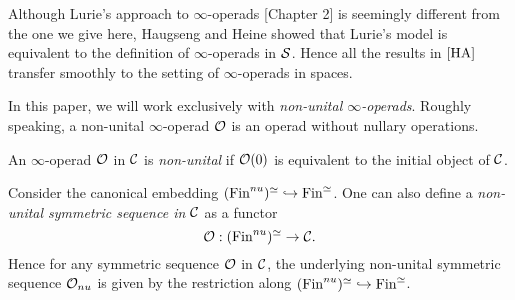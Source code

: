 \begin{remark}
Although Lurie's approach to $\infty$-operads \cite{HA}[Chapter 2] is seemingly different from the one we give here,
Haugseng \cite{Haugsengsymseq} and Heine \cite{Hadrianphdthesis} showed that Lurie's model is equivalent to the definition of $\infty$-operads in $\operatorname{\mathcal{S}}$. Hence all the results in $\cite{HA}$ transfer smoothly to the setting of $\infty$-operads in spaces.
\end{remark}

In this paper, we will work exclusively with \emph{non-unital $\infty$-operads}. Roughly speaking, a non-unital $\infty$-operad ${\mathcal{O}}$ is an operad without nullary operations.
\begin{definition}
	\label{non-unital operad}
	An $\infty$-operad ${\mathcal{O}}$ in ${\mathcal{C}}$ is \emph{non-unital} if ${\mathcal{O}}(0)$ is equivalent to the initial object of ${\mathcal{C}}$. 
\end{definition}



\begin{remark}
Consider the canonical embedding $(\operatorname{Fin}^{nu})^{\simeq}\hookrightarrow \operatorname{Fin}^{\simeq}$. One can also define a \emph{non-unital symmetric sequence in ${\mathcal{C}}$}  as a functor 
\[
{\mathcal{O}}:(\operatorname{Fin}^{nu})^{\simeq}\to {\mathcal{C}}.
\]
Hence for any symmetric sequence ${\mathcal{O}}$ in ${\mathcal{C}}$, 
the underlying non-unital symmetric sequence ${\mathcal{O}}_{nu}$ is given by the restriction along $(\operatorname{Fin}^{nu})^{\simeq}\hookrightarrow \operatorname{Fin}^{\simeq}$.
\end{remark}











